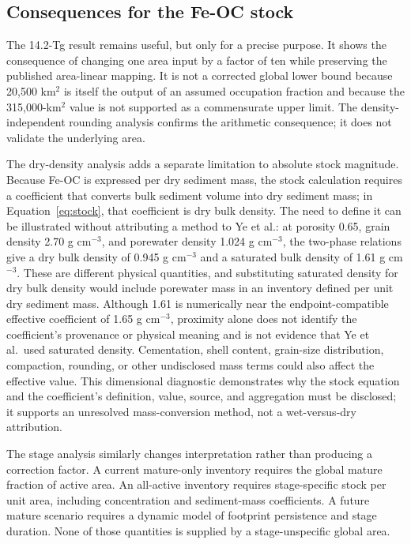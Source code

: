 \documentclass[11pt,letterpaper]{article}
\begin{document}
\subsection{Consequences for the Fe-OC stock}

The 14.2-Tg result remains useful, but only for a precise purpose. It shows the consequence of changing one area input by a factor of ten while preserving the published area-linear mapping. It is not a corrected global lower bound because 20,500 km$^2$ is itself the output of an assumed occupation fraction and because the 315,000-km$^2$ value is not supported as a commensurate upper limit. The density-independent rounding analysis confirms the arithmetic consequence; it does not validate the underlying area.

The dry-density analysis adds a separate limitation to absolute stock magnitude. Because Fe-OC is expressed per dry sediment mass, the stock calculation requires a coefficient that converts bulk sediment volume into dry sediment mass; in Equation~\eqref{eq:stock}, that coefficient is dry bulk density. The need to define it can be illustrated without attributing a method to Ye et al.: at porosity 0.65, grain density 2.70 g cm$^{-3}$, and porewater density 1.024 g cm$^{-3}$, the two-phase relations give a dry bulk density of 0.945 g cm$^{-3}$ and a saturated bulk density of 1.61 g cm$^{-3}$. These are different physical quantities, and substituting saturated density for dry bulk density would include porewater mass in an inventory defined per unit dry sediment mass. Although 1.61 is numerically near the endpoint-compatible effective coefficient of 1.65 g cm$^{-3}$, proximity alone does not identify the coefficient's provenance or physical meaning and is not evidence that Ye et al.\ used saturated density. Cementation, shell content, grain-size distribution, compaction, rounding, or other undisclosed mass terms could also affect the effective value. This dimensional diagnostic demonstrates why the stock equation and the coefficient's definition, value, source, and aggregation must be disclosed; it supports an unresolved mass-conversion method, not a wet-versus-dry attribution.

The stage analysis similarly changes interpretation rather than producing a correction factor. A current mature-only inventory requires the global mature fraction of active area. An all-active inventory requires stage-specific stock per unit area, including concentration and sediment-mass coefficients. A future mature scenario requires a dynamic model of footprint persistence and stage duration. None of those quantities is supplied by a stage-unspecific global area.
\end{document}
